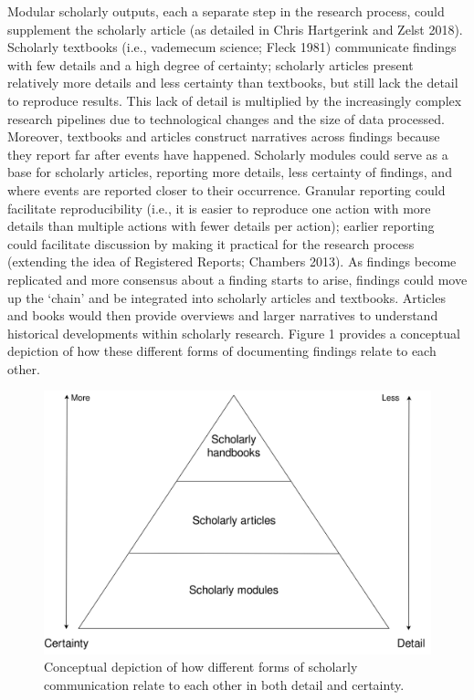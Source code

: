 \documentclass[a4paper]{article}
\begin{document}
Modular scholarly outputs, each a separate step in the research process,
could supplement the scholarly article (as detailed in Chris Hartgerink
and Zelst 2018). Scholarly textbooks (i.e., vademecum science; Fleck
1981) communicate findings with few details and a high degree of
certainty; scholarly articles present relatively more details and less
certainty than textbooks, but still lack the detail to reproduce
results. This lack of detail is multiplied by the increasingly complex
research pipelines due to technological changes and the size of data
processed. Moreover, textbooks and articles construct narratives across
findings because they report far after events have happened. Scholarly
modules could serve as a base for scholarly articles, reporting more
details, less certainty of findings, and where events are reported
closer to their occurrence. Granular reporting could facilitate
reproducibility (i.e., it is easier to reproduce one action with more
details than multiple actions with fewer details per action); earlier
reporting could facilitate discussion by making it practical for the
research process (extending the idea of Registered Reports; Chambers
2013). As findings become replicated and more consensus about a finding
starts to arise, findings could move up the `chain' and be integrated
into scholarly articles and textbooks. Articles and books would then
provide overviews and larger narratives to understand historical
developments within scholarly research. Figure 1 provides a conceptual
depiction of how these different forms of documenting findings relate to
each other.

\begin{figure}

{\centering \includegraphics[width=1\linewidth]{assets/fig1} 

}

\caption{Conceptual depiction of how different forms of scholarly communication relate to each other in both detail and certainty.}\label{fig:unnamed-chunk-2}
\end{figure}
\end{document}
